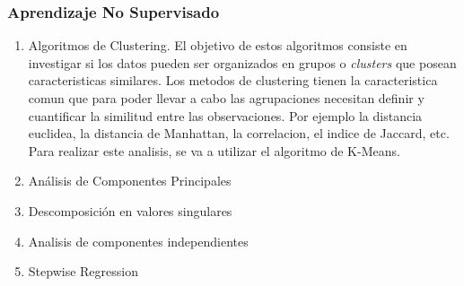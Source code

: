 \documentclass[spanish,12pt, a4paper,twoside]{paper}
\begin{document}
\subsubsection{Aprendizaje No Supervisado}
\begin{enumerate}
\item Algoritmos de Clustering. El objetivo de estos algoritmos consiste en investigar si los datos pueden ser organizados en grupos o \textit{clusters} que posean caracteristicas similares. %
Los metodos de clustering tienen la caracteristica comun que para poder llevar a cabo las agrupaciones necesitan definir y cuantificar la similitud entre las observaciones. Por ejemplo la distancia euclidea, la distancia de Manhattan, la correlacion, el indice de Jaccard, etc. %
Para realizar este analisis, se va a utilizar el algoritmo de K-Means. %
\item Análisis de Componentes Principales
\item Descomposición en valores singulares
\item Analisis de componentes independientes
\item Stepwise Regression
\end{enumerate}

\end{document}
